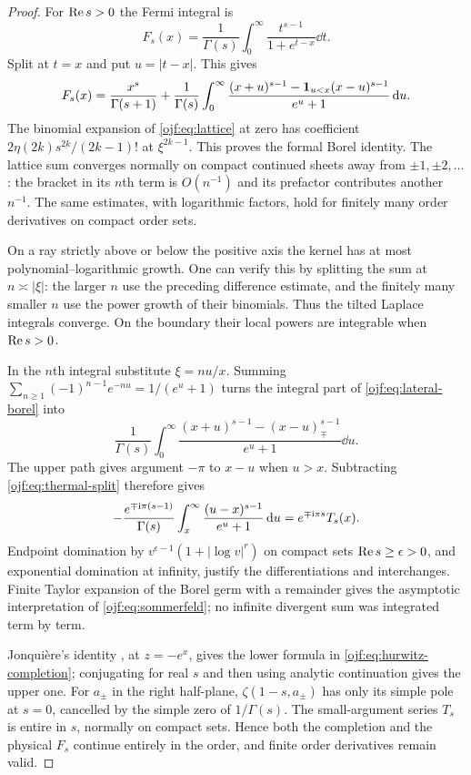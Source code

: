 \begin{proof}
For $\operatorname{Re} s>0$ the Fermi integral is
\[
 F_s(x)=\frac1{\Gamma(s)}\int_0^\infty
                    \frac{t^{s-1}}{1+e^{t-x}}\dd t.
\]
Split at $t=x$ and put $u=|t-x|$. This gives
\begin{equation}\label{ojf:eq:thermal-split}
 F_s(x)=\frac{x^s}{\Gamma(s+1)}+
 \frac1{\Gamma(s)}\int_0^\infty
 \frac{(x+u)^{s-1}-{\bf1}_{u<x}(x-u)^{s-1}}{e^u+1}\,\mathrm d u.
\end{equation}
The binomial expansion of \eqref{ojf:eq:lattice} at zero has coefficient
$2\eta(2k)s^{\underline{2k}}/(2k-1)!$ at $\xi^{2k-1}$.
This proves the formal Borel identity. The lattice sum converges normally
on compact continued sheets away from $\pm1,\pm2,\ldots$: the bracket
in its $n$th term is $O(n^{-1})$ and its prefactor contributes another
$n^{-1}$. The same estimates, with logarithmic factors, hold for finitely
many order derivatives on compact order sets.

On a ray strictly above or below the positive axis the kernel has at most
polynomial--logarithmic growth. One can verify this by splitting the sum
at $n\asymp|\xi|$: the larger $n$ use the preceding difference estimate,
and the finitely many smaller $n$ use the power growth of their binomials.
Thus the tilted Laplace integrals converge. On the boundary their local
powers are integrable when $\operatorname{Re} s>0$.

In the $n$th integral substitute $\xi=nu/x$. Summing
$\sum_{n\ge1}(-1)^{n-1}e^{-nu}=1/(e^u+1)$ turns the integral part
of \eqref{ojf:eq:lateral-borel} into
\[
 \frac1{\Gamma(s)}\int_0^\infty
 \frac{(x+u)^{s-1}-(x-u)_{\mp}^{s-1}}{e^u+1}\dd u.
\]
The upper path gives argument $-\pi$ to $x-u$ when $u>x$.
Subtracting \eqref{ojf:eq:thermal-split} therefore gives
\[
 -\frac{e^{\mp\mathrm{i}\pi(s-1)}}{\Gamma(s)}
  \int_x^\infty\frac{(u-x)^{s-1}}{e^u+1}\,\mathrm d u
   =e^{\mp\mathrm{i}\pi s}T_s(x).
\]
Endpoint domination by $v^{\epsilon-1}(1+|\log v|^r)$ on compact
sets $\operatorname{Re} s\ge\epsilon>0$, and exponential domination at infinity,
justify the differentiations and interchanges. Finite Taylor expansion
of the Borel germ with a remainder gives the asymptotic interpretation
of \eqref{ojf:eq:sommerfeld}; no infinite divergent sum was integrated
term by term.

Jonqui\`ere's identity \cite[Eq.~25.12.13]{rw:DLMFPolylog}, at $z=-e^x$,
gives the lower formula in \eqref{ojf:eq:hurwitz-completion}; conjugating
for real $s$ and then using analytic continuation gives the upper one.
For $a_\pm$ in the right half-plane, $\zeta(1-s,a_\pm)$ has only its
simple pole at $s=0$, cancelled by the simple zero of $1/\Gamma(s)$.
The small-argument series $T_s$ is entire in $s$, normally on compact
sets. Hence both the completion and the physical $F_s$ continue
entirely in the order, and finite order derivatives remain valid.
\end{proof}

